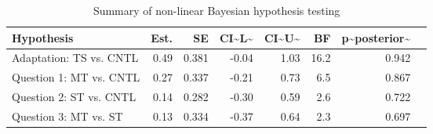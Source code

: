 \begin{table}

\caption{\label{tab:unnamed-chunk-30}Summary of non-linear Bayesian hypothesis testing}
\centering
\begin{tabular}[t]{l|r|r|r|r|r|r|l}
\hline
Hypothesis & Est. & SE & CI\textasciitilde{}L\textasciitilde{} & CI\textasciitilde{}U\textasciitilde{} & BF & p\textasciitilde{}posterior\textasciitilde{} & \\
\hline
Adaptation: TS vs. CNTL & 0.49 & 0.381 & -0.04 & 1.03 & 16.2 & 0.942 & \\
\hline
Question 1: MT vs. CNTL & 0.27 & 0.337 & -0.21 & 0.73 & 6.5 & 0.867 & \\
\hline
Question 2: ST vs. CNTL & 0.14 & 0.282 & -0.30 & 0.59 & 2.6 & 0.722 & \\
\hline
Question 3: MT vs. ST & 0.13 & 0.334 & -0.37 & 0.64 & 2.3 & 0.697 & \\
\hline
\end{tabular}
\end{table}
